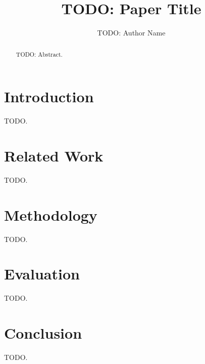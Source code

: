 \documentclass[sigconf]{acmart}
\title{TODO: Paper Title}
\author{TODO: Author Name}
\affiliation{\institution{TODO: Institution}}
\begin{document}
\begin{abstract}
TODO: Abstract.
\end{abstract}
\maketitle

\section{Introduction}
TODO.

\section{Related Work}
TODO.

\section{Methodology}
TODO.

\section{Evaluation}
TODO.

\section{Conclusion}
TODO.



\end{document}
